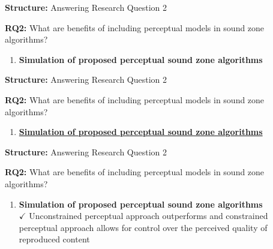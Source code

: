 \documentclass[aspectratio=169]{beamer}
\begin{document}
\begin{frame}{\textbf{Structure:} Answering Research Question 2}
    \begin{block}{\textbf{RQ2:} What are benefits of including perceptual models in sound zone algorithms?}
        \begin{enumerate}
            \item \textbf{Simulation of proposed perceptual sound zone algorithms}
                \\\vspace{\baselineskip}\vspace{\baselineskip}\vspace{2.2pt}
                \vspace{3pt}
        \end{enumerate}
    \end{block}
\end{frame}

\begin{frame}{\textbf{Structure:} Answering Research Question 2}
    \begin{block}{\textbf{RQ2:} What are benefits of including perceptual models in sound zone algorithms?}
        \begin{enumerate}
            \item \underline{\textbf{Simulation of proposed perceptual sound zone algorithms}}
                \\\vspace{\baselineskip}\vspace{\baselineskip}
                \vspace{3pt}
        \end{enumerate}
    \end{block}
\end{frame}

\begin{frame}{\textbf{Structure:} Answering Research Question 2}
    \begin{block}{\textbf{RQ2:} What are benefits of including perceptual models in sound zone algorithms?}
        \begin{enumerate}
            \item \textbf{Simulation of proposed perceptual sound zone algorithms}
                \\{{$\mathbf{\checkmark}$} Unconstrained perceptual approach outperforms and constrained perceptual approach allows for control over the perceived quality of reproduced content}
                \vspace{3pt}\vspace{2.2pt}
        \end{enumerate}
    \end{block}
\end{frame}
\end{document}
